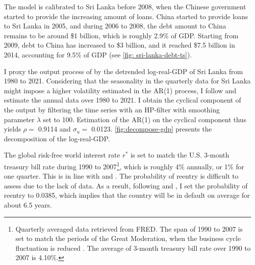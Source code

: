 The model is calibrated to Sri Lanka before 2008, when the Chinese government started to provide the increasing amount of loans.
China started to provide loans to Sri Lanka in 2005, and during 2006 to 2008, the debt amount to China remains to be around \$1 billion, which is roughly 2.9\% of GDP. Starting from 2009, debt to China has increased to \$3 billion, and it reached \$7.5 billion in 2014, accounting for 9.5\% of GDP
(see \autoref{fig: sri-lanka-debt-ts}).

I proxy the output process of  by the detrended log-real-GDP of Sri Lanka from 1980 to 2021. Considering that the seasonality in the quarterly data for Sri Lanka might impose a higher volatility estimated in the AR(1) process, I follow \citet{Hinrichsen_2020-chapter4} and estimate the annual data over 1980 to 2021. I obtain the cyclical component of the output by filtering the time series with an HP-filter with smoothing parameter $\lambda$ set to 100.
Estimation of the AR(1) on the cyclical component thus yields $\rho = $ 0.9114 and $\sigma_u = $ 0.0123\footnotemark{}. \autoref{fig:decompose-gdp} presents the decomposition of the log-real-GDP.

The global risk-free world interest rate $r^*$ is set to match the U.S. 3-month treasury bill rate during 1990 to 2007\footnote{
    Quarterly averaged data retrieved from FRED. The span of 1990 to 2007 is set to match the periods of the Great Moderation, when the business cycle fluctuation is reduced \citep{FedHistory-GreatModeration}. The average of 3-month treasury bill rate over 1990 to 2007 is 4.10\%.
}, which is roughly 4\% annually, or 1\% for one quarter. This is in line with \citet{Chatterjee-12} and \citet{Na-18}.
The probability of reentry is difficult to assess due to the lack of data. As a result, following \citet*{Chatterjee-12} and \citet*{Hinrichsen_2020-chapter4}, I set the probability of reentry to 0.0385, which implies that the country will be in default on average for about 6.5 years.

